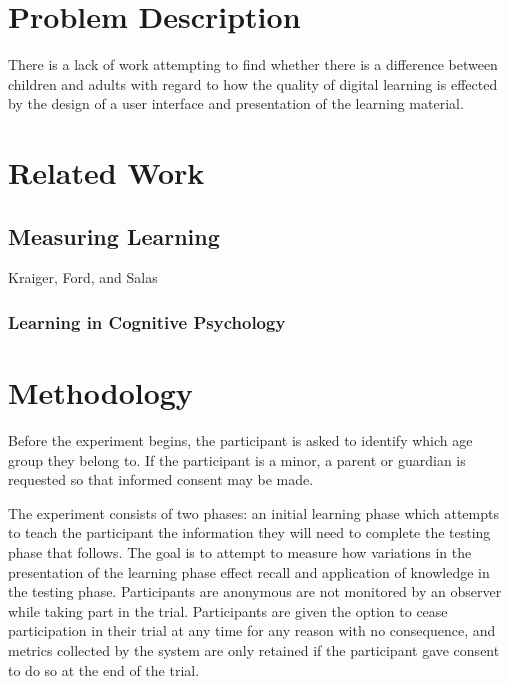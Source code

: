 \documentclass[12pt]{report}
\begin{document}
% 

\chapter{Problem Description}
\label{ch:Problem Description}

There is a lack of work attempting to find whether there is a difference between children and adults with regard to how the quality of digital learning is effected by the design of a user interface and presentation of the learning material. 

\chapter{Related Work}
\label{ch:Related Work}

\section{Measuring Learning}

Kraiger, Ford, and Salas \cite{kraiger1993application}

\subsection{Learning in Cognitive Psychology}

\chapter{Methodology}
\label{ch:Methodology}

Before the experiment begins, the participant is asked to identify which age group they belong to. If the participant is a minor, a parent or guardian is requested so that informed consent may be made.

The experiment consists of two phases: an initial learning phase which attempts to teach the participant the information they will need to complete the testing phase that follows. The goal is to attempt to measure how variations in the presentation of the learning phase effect recall and application of knowledge in the testing phase. Participants are anonymous are not monitored by an observer while taking part in the trial. Participants are given the option to cease participation in their trial at any time for any reason with no consequence, and metrics collected by the system are only retained if the participant gave consent to do so at the end of the trial.
\end{document}
